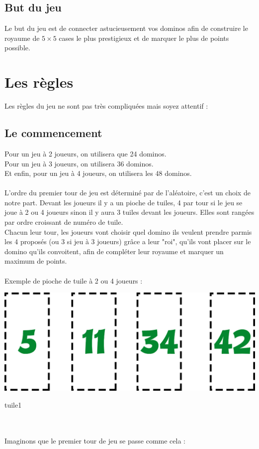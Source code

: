 \subsection{But du jeu}
Le but du jeu est de connecter astucieusement vos dominos afin de construire le royaume de $5 \times 5$ cases le plus prestigieux et de marquer le plus de points possible.

\newpage
\section{Les règles}

Les règles du jeu ne sont pas très compliquées mais soyez attentif :

\subsection{Le commencement}
Pour un jeu à 2 joueurs, on utilisera que 24 dominos.\\
Pour un jeu à 3 joueurs, on utilisera 36 dominos.\\
Et enfin, pour un jeu à 4 joueurs, on utilisera les 48 dominos.\\\\
L'ordre du premier tour de jeu est déterminé par de l'aléatoire, c'est un choix de notre part. Devant les joueurs il y a un pioche de tuiles, 4 par tour si le jeu se joue à 2 ou 4 joueurs sinon il y aura 3 tuiles devant les joueurs. Elles sont rangées par ordre croissant de numéro de tuile.\\
Chacun leur tour, les joueurs vont choisir quel domino ils veulent prendre parmis les 4  proposés (ou 3 si jeu à 3 joueurs) grâce a leur "roi", qu'ils vont placer sur le domino qu'ils convoitent, afin de compléter leur royaume et marquer un maximum de points.\\
\\
Exemple de pioche de tuile à 2 ou 4 joueurs :\\

\begin{center}
  \includegraphics[scale=0.5]{Figures/tuiledistrib.png}
  \caption{tuile1}
\end{center}
\\ \\
Imaginons que le premier tour de jeu se passe comme cela :\\

